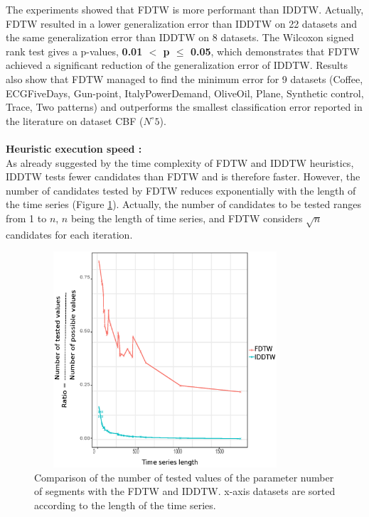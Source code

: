 The experiments showed that FDTW is more performant than IDDTW. Actually, FDTW resulted in a
lower generalization error than IDDTW on 22 datasets and the same generalization error than IDDTW on 8
datasets.  The Wilcoxon signed rank test gives a
p-values, \textbf{ 0.01 $<$ p $\leq$ 0.05}, which demonstrates that FDTW achieved a
significant reduction of the generalization error of IDDTW. Results also show that FDTW managed to
find the minimum error for 9 datasets (Coffee, ECGFiveDays, Gun-point, ItalyPowerDemand, OliveOil, Plane, Synthetic control, Trace, Two
patterns) and outperforms the smallest classification error reported in the literature on
dataset CBF ($N^{\circ} 5$).




\paragraph{}\textbf{Heuristic execution speed : }\\
As already suggested by the time complexity of  FDTW and IDDTW heuristics, IDDTW
tests fewer candidates than FDTW and is therefore faster. However, the number of candidates tested
by FDTW reduces exponentially with the length of the time series (Figure
\ref{NumberOfValuesTested}).
Actually, the number of candidates to be tested ranges from 1 to $n$, $n$ being the  length of time
series, and FDTW considers $\sqrt{n}$ candidates for each iteration.



\begin{figure}[h]
\center
\includegraphics[width=23pc,height=19pc]{images/nombre_de_candidats_testees}
\caption{Comparison of the number of tested values of the parameter number of segments with
the FDTW and IDDTW. x-axis datasets are sorted according to
the length of the time series. }

\label{NumberOfValuesTested}

\end{figure}

